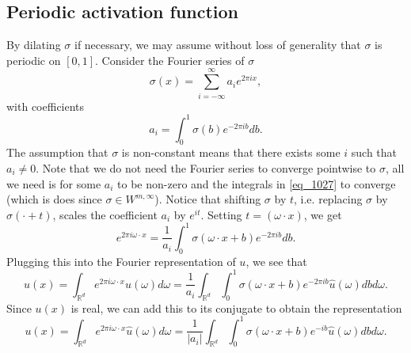 \subsection{Periodic activation function}
By dilating $\sigma$ if necessary, we may assume without loss of generality that $\sigma$ is periodic on $[0,1]$. Consider the Fourier series of $\sigma$
\begin{equation}
\sigma(x) = \displaystyle\sum_{i=-\infty}^\infty a_i e^{2\pi ix},
\end{equation}
with coefficients
\begin{equation}\label{eq_1027}
a_i =  \int_0^{1} \sigma(b)e^{-2\pi ib}db. 
\end{equation}
The assumption that $\sigma$ is non-constant means that there exists some $i$ such that $a_i \neq 0$. Note that we do not need the Fourier series to converge pointwise to $\sigma$, all we need is for some $a_i$ to be non-zero and the integrals in \eqref{eq_1027} to converge (which is does since $\sigma\in W^{m,\infty}$). Notice that shifting $\sigma$ by $t$, i.e. replacing $\sigma$ by $\sigma(\cdot+t)$, scales the coefficient $a_i$ by $e^{it}$. Setting $t = (\omega \cdot x)$, we get
\begin{equation}
e^{2\pi i\omega\cdot x} = \frac{1}{a_i}\int_0^{1} \sigma\left(\omega\cdot x + b\right)e^{-2\pi ib}db.
\end{equation}
Plugging this into the Fourier representation of $u$, we see that
\begin{equation}
u(x) = \int_{\mathbb{R}^d} e^{2\pi i\omega\cdot x}\hat{u}(\omega)d\omega = \frac{1}{ a_i}
\int_{\mathbb{R}^d}\int_0^{1}\sigma\left(\omega\cdot x + b\right)e^{-2\pi ib}\hat{u}(\omega)dbd\omega.
\end{equation}
Since $u(x)$ is real, we can add this to its conjugate to obtain the representation
\begin{equation}\label{eq_1029}
u(x) = \int_{\mathbb{R}^d} e^{2\pi i\omega\cdot x}\hat{u}(\omega)d\omega = \frac{1}{|a_i|}
\int_{\mathbb{R}^d}\int_0^{1}\sigma\left(\omega\cdot x + b\right)e^{-ib}\hat{u}(\omega)dbd\omega.
\end{equation}
 
 
